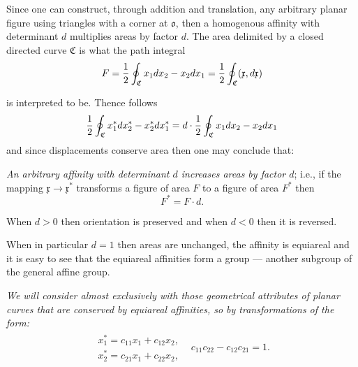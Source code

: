 \documentclass[11pt]{book} \usepackage{amssymb}
\newcommand{\myvec}[1]{\mathfrak{#1}}
\begin{document}
Since one can construct, through addition and translation, any arbitrary planar 
figure using triangles with a corner at $\myvec{o}$, then a homogenous 
affinity with determinant $d$ multiplies areas by factor $d$.
The area delimited by a closed directed curve $\mathfrak{C}$ is what the path
integral
\begin{equation}
  \label{eq:curve_area}
  F={1\over 2}\oint_\mathfrak{C}x_1dx_2-x_2dx_1
  ={1\over 2}\oint_\mathfrak{C}(\myvec{x},d\myvec{x})
\end{equation}
\begin{figure}[htp]
  \begin{center}
  \end{center}
  \caption{}
\end{figure}
is interpreted to be. Thence follows
\begin{equation}
  \label{eq:area_transformation}
  {1\over 2}\oint_\mathfrak{C}x^*_1dx^*_2-x^*_2dx^*_1
  =d\cdot{1\over 2}\oint_\mathfrak{C}x_1dx_2-x_2dx_1
\end{equation}
and since displacements conserve area then one may conclude that:

{\em An arbitrary affinity with determinant $d$ increases areas by factor $d$};
i.e., if the mapping $\myvec{x}\to\myvec{x}^*$ transforms a figure of area $F$
to a figure of area $F^*$ then
\begin{equation}
  \label{eq:area_transform2}
  F^*=F\cdot d.
\end{equation}

When $d>0$ then orientation is preserved and when $d<0$ then it is reversed.

When in particular $d=1$ then areas are unchanged, the affinity is equiareal
and it is easy to see that the equiareal affinities form a group --- another
subgroup of the general affine group.

{\em We will consider almost exclusively with those geometrical attributes of
planar curves that are conserved by equiareal affinities, so by transformations
of the form:}
\begin{equation}
  \label{eq:equiareal_affinities}
  \begin{array}{ll}
    \begin{array}{l}
      x_1^*=c_{11}x_1+c_{12}x_2,\\
      x_2^*=c_{21}x_1+c_{22}x_2,
    \end{array}
    & c_{11}c_{22}-c_{12}c_{21}=1.
  \end{array}
\end{equation}
\end{document}

